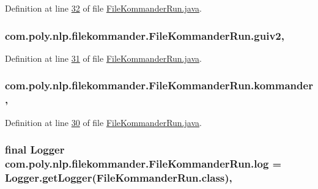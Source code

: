 Definition at line \hyperlink{L32}{32} of file \hyperlink{}{File\-Kommander\-Run.\-java}.

\hypertarget{classcom_1_1poly_1_1nlp_1_1filekommander_1_1_file_kommander_run_af105be529e7e9e9312aab57f6381b5ca}{
\subsubsection[{guiv2}]{ com.\-poly.\-nlp.\-filekommander.\-File\-Kommander\-Run.\-guiv2\hspace{0.3cm}{\ttfamily [static]}, {\ttfamily [private]}}}\label{classcom_1_1poly_1_1nlp_1_1filekommander_1_1_file_kommander_run_af105be529e7e9e9312aab57f6381b5ca}


Definition at line \hyperlink{L31}{31} of file \hyperlink{}{File\-Kommander\-Run.\-java}.

\hypertarget{classcom_1_1poly_1_1nlp_1_1filekommander_1_1_file_kommander_run_a2dffc1b40df78c82faf9567da220dae2}{
\subsubsection[{kommander}]{ com.\-poly.\-nlp.\-filekommander.\-File\-Kommander\-Run.\-kommander\hspace{0.3cm}{\ttfamily [static]}, {\ttfamily [private]}}}\label{classcom_1_1poly_1_1nlp_1_1filekommander_1_1_file_kommander_run_a2dffc1b40df78c82faf9567da220dae2}


Definition at line \hyperlink{L30}{30} of file \hyperlink{}{File\-Kommander\-Run.\-java}.

\hypertarget{classcom_1_1poly_1_1nlp_1_1filekommander_1_1_file_kommander_run_ae7643c914a5fa93d155faafc32529519}{
\subsubsection[{log}]{\setlength{\rightskip}{0pt plus 5cm}final Logger com.\-poly.\-nlp.\-filekommander.\-File\-Kommander\-Run.\-log = Logger.\-get\-Logger(File\-Kommander\-Run.\-class)\hspace{0.3cm}{\ttfamily [static]}, {\ttfamily [private]}}}\label{classcom_1_1poly_1_1nlp_1_1filekommander_1_1_file_kommander_run_ae7643c914a5fa93d155faafc32529519}


